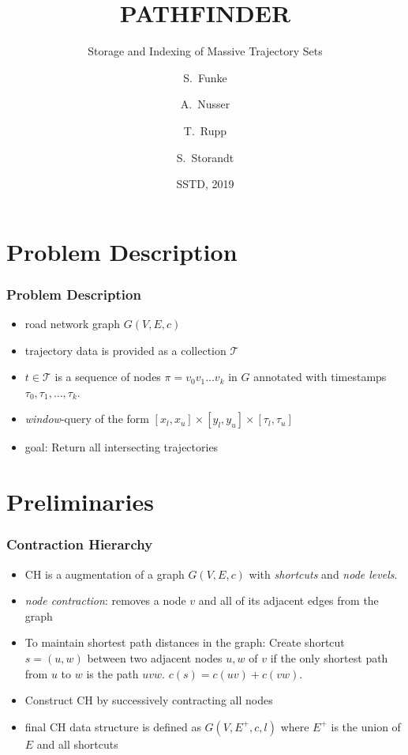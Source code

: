 \documentclass{beamer}
\title[Pathfinder] %
{PATHFINDER}
\subtitle{Storage and Indexing of Massive Trajectory Sets}
\author[Funke, Nusser, Rupp, Storandt] %
{S.~Funke\inst{1} \and A.~Nusser\inst{2} \and T.~Rupp\inst{3} \and S.~Storandt\inst{4}}
\institute[Universities] %
{
	\inst{1}%
	University of Stuttgart
	\and
	\inst{2}%
	Max Planck Institute for Informatics
	\and
	\inst{3}%
	University of Stuttgart
	\and
	\inst{4}%
	University of Konstanz
}
\date[SSTD 2019] %
{SSTD, 2019}
\begin{document}
\frame{\titlepage}

\frame{\tableofcontents}

\section{Problem Description}
\begin{frame}
	\frametitle{Problem Description}
	\begin{itemize}
		\item<1-> road network graph $G(V,E,c)$
		\item<2-> trajectory data is provided as a collection $\mathcal{T}$
		\item<3-> $t\in \mathcal{T}$ is a sequence of nodes $\pi=v_0 v_1 \dots v_k$ in  $G$ annotated with timestamps $\tau_0, \tau_1, \dots, \tau_k$.
		\item<4-> \emph{window}-query of the form $[x_l, x_u]\times[y_l, y_u]\times[\tau_l, \tau_u]$
		\item<5-> goal: Return all intersecting trajectories
	\end{itemize}
\end{frame}

\section{Preliminaries}
\begin{frame}
	\frametitle{Contraction Hierarchy}
	\begin{itemize}
		\item<1-> CH is a augmentation of a graph $G(V,E,c)$ with \emph{shortcuts} and \emph{node levels}.
		\item<2-> \emph{node contraction}: removes a node $v$ and all of its adjacent edges from the graph
		\item<3-> To maintain shortest path distances in the graph: Create shortcut $s = (u, w)$ between two adjacent nodes $u,w$ of $v$ if the only shortest path from $u$ to $w$ is the path $uvw$. $c(s) = c(uv) + c(vw)$.
		\item<4-> Construct CH by successively contracting all nodes
		\item<5-> final CH data structure is defined as $G(V, E^+, c, l)$ where $E^+$ is the union of $E$ and all shortcuts
	\end{itemize}
\end{frame}
\end{document}
